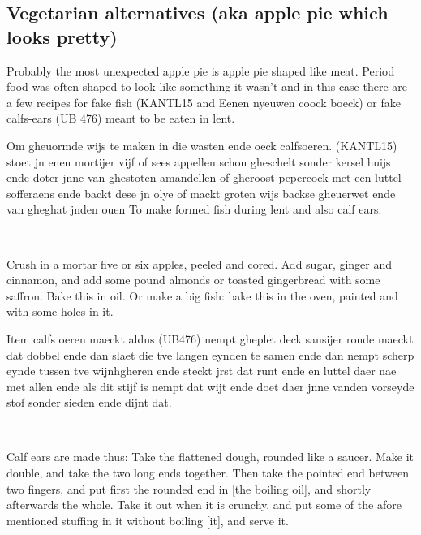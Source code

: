 \documentclass[a4paper]{article}
\begin{document}
\subsection{Vegetarian alternatives (aka apple pie which looks pretty)}
Probably the most unexpected apple pie is apple pie shaped like meat. Period food was often shaped to look like something it wasn’t and in this case there are a few recipes for fake fish (KANTL15 and Eenen nyeuwen coock boeck) or fake calfs-ears (UB 476) meant to be eaten in lent.

\medskip
\begin{minipage}{.45\textwidth}
Om gheuormde wijs te maken in die wasten ende oeck calfsoeren. (KANTL15)
stoet jn enen mortijer vijf of sees appellen schon gheschelt sonder kersel huijs ende doter jnne van ghestoten amandellen of gheroost pepercock met een luttel sofferaens ende backt dese jn olye of mackt groten wijs backse gheuerwet ende van gheghat jnden ouen	To make formed fish during lent and also calf ears.
\end{minipage}
\begin{minipage}{0.05\textwidth}
\ \ \ 
\end{minipage}
\begin{minipage}{.45\textwidth}
Crush in a mortar five or six apples, peeled and cored. Add sugar, ginger and cinnamon, and add some pound almonds or toasted gingerbread with some saffron. Bake this in oil. Or make a big fish: bake this in the oven, painted and with some holes in it.
\end{minipage}

\medskip
\begin{minipage}{.45\textwidth}
Item calfs oeren maeckt aldus (UB476)
nempt gheplet deck sausijer ronde maeckt dat dobbel ende dan slaet die tve langen eynden te samen ende dan nempt scherp eynde tussen tve wijnhgheren ende steckt jrst dat runt ende en luttel daer nae met allen ende als dit stijf is nempt dat wijt ende doet daer jnne vanden vorseyde stof sonder sieden ende dijnt dat.
\end{minipage}
\begin{minipage}{0.05\textwidth}
\ \ \ 
\end{minipage}
\begin{minipage}{.45\textwidth}
	Calf ears are made thus: Take the flattened dough, rounded like a saucer. Make it double, and take the two long ends together. Then take the pointed end between two fingers, and put first the rounded end in [the boiling oil], and shortly afterwards the whole. Take it out when it is crunchy, and put some of the afore mentioned stuffing in it without boiling [it], and serve it.
\end{minipage}
\end{document}
